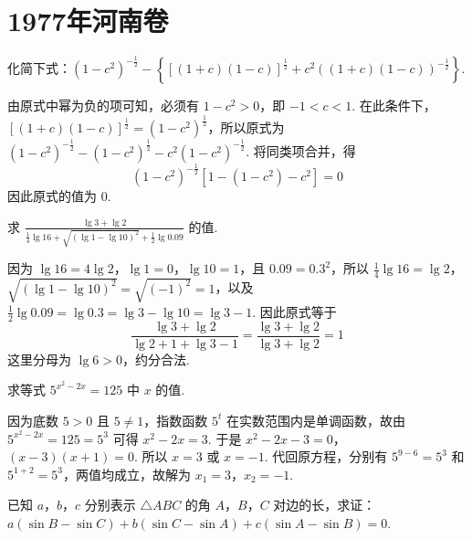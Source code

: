 \chapter{1977年河南卷}

\begin{problem}
化简下式：\( \left( 1-c^2 \right)^{- \frac{1}{2}}-\left\{ \left[ \left( 1+c \right)\left( 1-c \right) \right]^{\frac{1}{2}}+c^2\left( \left( 1+c \right)\left( 1-c \right) \right)^{- \frac{1}{2}} \right\} \).
\end{problem}

\begin{solution}
由原式中幂为负的项可知，必须有 \(1-c^2>0\)，即 \(-1<c<1\). 在此条件下，
\(\left[(1+c)(1-c)\right]^{\frac12}=(1-c^2)^{\frac12}\)，所以原式为
\(\left(1-c^2\right)^{-\frac12}-\left(1-c^2\right)^{\frac12}-c^2\left(1-c^2\right)^{-\frac12}\). 将同类项合并，得
\[
\left(1-c^2\right)^{-\frac12}\left[1-\left(1-c^2\right)-c^2\right]=0
\]
因此原式的值为 \(0\).
\end{solution}

\begin{problem}
求 \( \frac{\lg 3+\lg 2}{\frac{1}{4}\lg 16+\sqrt{\left( \lg 1-\lg 10 \right)^2}+\frac{1}{2}\lg 0.09} \) 的值.
\end{problem}

\begin{solution}
因为 \(\lg16=4\lg2\)，\(\lg1=0\)，\(\lg10=1\)，且
\(0.09=0.3^2\)，所以
\(\frac14\lg16=\lg2\)，\(\sqrt{(\lg1-\lg10)^2}=\sqrt{(-1)^2}=1\)，以及
\(\frac12\lg0.09=\lg0.3=\lg3-\lg10=\lg3-1\). 因此原式等于
\[
\frac{\lg3+\lg2}{\lg2+1+\lg3-1}
=\frac{\lg3+\lg2}{\lg3+\lg2}=1
\]
这里分母为 \(\lg6>0\)，约分合法.
\end{solution}

\begin{problem}
求等式 \( 5^{x^2-2x}=125 \) 中 \( x \) 的值.
\end{problem}

\begin{solution}
因为底数 \(5>0\) 且 \(5\ne1\)，指数函数 \(5^t\) 在实数范围内是单调函数，故由
\(5^{x^2-2x}=125=5^3\) 可得 \(x^2-2x=3\). 于是
\(x^2-2x-3=0\)，\(\left(x-3\right)\left(x+1\right)=0\).
所以 \(x=3\) 或 \(x=-1\). 代回原方程，分别有 \(5^{9-6}=5^3\) 和 \(5^{1+2}=5^3\)，两值均成立，故解为 \(x_1=3\)，\(x_2=-1\).
\end{solution}

\begin{problem}
已知 \( a \)，\( b \)，\( c \) 分别表示 \( \triangle ABC \) 的角 \(A\)，\(B\)，\(C\) 对边的长，求证：\( a\left( \sin B-\sin C \right)+b\left( \sin C-\sin A \right)+c\left( \sin A-\sin B \right)=0 \).
\end{problem}

